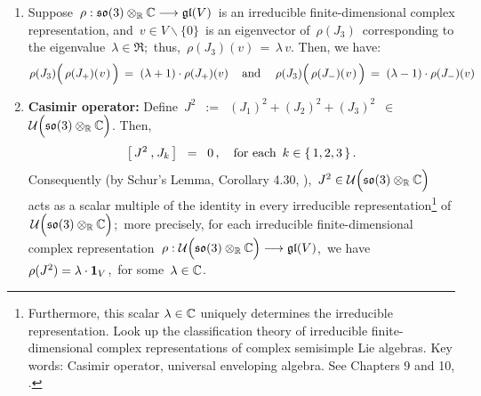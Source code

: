 \begin{proposition}
\begin{enumerate}
\begin{enumerate}
	\end{enumerate}
\item
	Suppose
	\,$\rho : \mathfrak{so}(3) \otimes_{\mathbb{R}} \mathbb{C} \longrightarrow \mathfrak{gl}(V)$\,
	is an irreducible finite-dimensional complex representation, and
	\,$v \in V \backslash\{0\}$\, is an eigenvector of \,$\rho(J_{3})$\,
	corresponding to the eigenvalue \,$\lambda \in \Re$;\, thus, \,$\rho(J_{3})(v) \,=\, \lambda\,v$.
	Then, we have:
	\begin{equation*}
	\rho(J_{3})\!\left(\,\rho(J_{+})(\overset{{\color{white}-}}{v})\,\right) \, = \; (\lambda+1)\cdot\rho(J_{+})(v)\,
	\quad\textnormal{and}\quad\;
	\rho(J_{3})\!\left(\,\rho(J_{-})(\overset{{\color{white}-}}{v})\,\right) \, = \; (\lambda-1)\cdot\rho(J_{-})(v)
	\end{equation*}
\item
	\textbf{Casimir operator:}\;\;
	Define
	\,$J^{2}$
	\,$:=$\,
	$(J_{1})^{2} + (J_{2})^{2} + (J_{3})^{2}$
	\,$\in$\
	 $\mathcal{U}\!\left(\mathfrak{so}(3) \overset{{\color{white}.}}{\otimes_{\Re}} \C\right)$.
	Then,
	\begin{equation*}
	\left[\,J^{2}\,\overset{{\color{white}1}}{,}\,J_{k}\,\right]
	\;\; = \;\;
		0\,,
	\quad
	\textnormal{for each \,$k \in \{\,1,2,3\,\}$}\,.
	\end{equation*}
	Consequently (by Schur's Lemma, Corollary 4.30, \cite{Hall2015}), 
	\,$J^{2} \in \mathcal{U}\!\left(\mathfrak{so}(3) \overset{{\color{white}.}}{\otimes_{\Re}} \C\right)$\,
	acts as a scalar multiple of the identity in every irreducible
	representation\footnote{Furthermore, this scalar $\lambda \in \mathbb{C}$ uniquely determines
	the irreducible representation.
	Look up the classification theory of irreducible finite-dimensional complex representations
	of complex semisimple Lie algebras.
	Key words: Casimir operator, universal enveloping algebra. See Chapters 9 and 10, \cite{Hall2015}.}
	of \,$\mathcal{U}\!\left(\mathfrak{so}(3) \overset{{\color{white}.}}{\otimes_{\Re}} \C\right)$;\,
	more precisely, for each irreducible finite-dimensional complex representation
	\,$\rho : \mathcal{U}\!\left(\mathfrak{so}(3) \overset{{\color{white}.}}{\otimes_{\Re}} \C\right) \longrightarrow \mathfrak{gl}(V)$,\,
	we have \,$\rho(J^{2}) = \lambda \cdot \textnormal{\textbf{1}}_{V}$,\,
	for some \,$\lambda \in \mathbb{C}$.
\end{enumerate}
\end{proposition}


